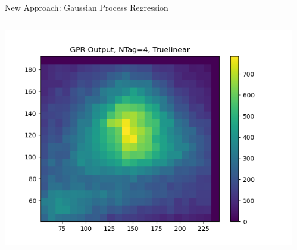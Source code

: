 \documentclass[10pt, aspectratio=169]{beamer}
\begin{document}
\begin{frame}{New Approach: Gaussian Process Regression}
\begin{columns}[onlytextwidth]
\begin{column}{0.4\textwidth}
      \includegraphics[width=0.8\linewidth, trim=0 0 4cm 1.5cm, clip]{images/kriging_Truelinear_4b.png}\\
    \end{column}
​  \end{columns}
\end{frame}
\end{document}
